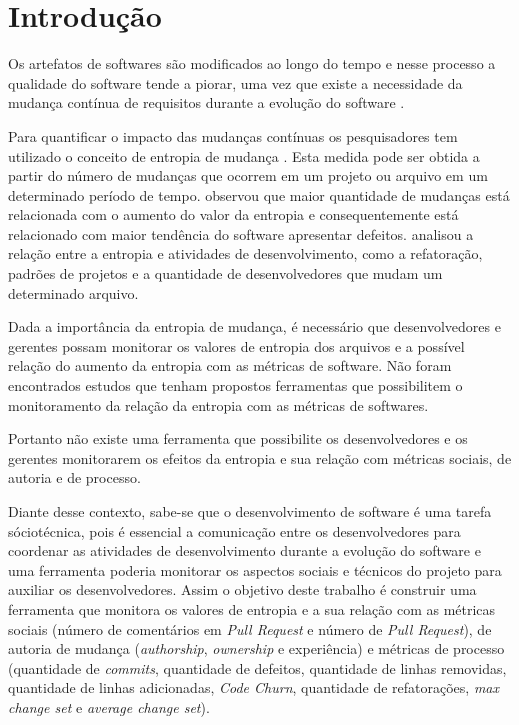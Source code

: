 \chapter{Introdução}

Os artefatos de softwares são modificados ao longo do tempo e nesse processo a qualidade do software tende a piorar, uma vez que existe a necessidade da mudança contínua de requisitos durante a evolução do software \cite{Hassan:2009:PFU:1555001.1555024}.

Para quantificar o impacto das mudanças contínuas os pesquisadores tem utilizado o conceito de entropia de mudança \cite{Hassan:2009:PFU:1555001.1555024}. Esta medida pode ser obtida a partir do número de mudanças que ocorrem em um projeto ou arquivo em um determinado período de tempo.  observou que maior quantidade de mudanças está relacionada com o aumento do valor da entropia e consequentemente está relacionado com maior tendência do software apresentar defeitos.  analisou a relação entre a entropia e atividades de desenvolvimento, como a refatoração, padrões de projetos e a quantidade de desenvolvedores que mudam um determinado arquivo.

Dada a importância da entropia de mudança, é necessário que desenvolvedores e gerentes possam monitorar os valores de entropia dos arquivos e a possível relação do aumento da entropia com as métricas de software. Não foram encontrados estudos que tenham propostos ferramentas que possibilitem o monitoramento da relação da entropia com as métricas de softwares.

Portanto não existe uma ferramenta que possibilite os desenvolvedores e os gerentes monitorarem os efeitos da entropia e sua relação com métricas sociais, de autoria e de processo.

Diante desse contexto, sabe-se que o desenvolvimento de software é uma tarefa sóciotécnica, pois é essencial a comunicação entre os desenvolvedores para coordenar as atividades de desenvolvimento durante a evolução do software e uma ferramenta poderia monitorar os aspectos sociais e técnicos do projeto para auxiliar os desenvolvedores. Assim o objetivo deste trabalho é construir uma ferramenta que monitora os valores de entropia e a sua relação com as métricas sociais (número de comentários em \textit{Pull Request} e número de \textit{Pull Request}), de autoria de mudança (\textit{authorship}, \textit{ownership} e experiência) e métricas de processo (quantidade de \textit{commits}, quantidade de defeitos, quantidade de linhas removidas, quantidade de linhas adicionadas, \textit{Code Churn}, quantidade de refatorações, \textit{max change set} e \textit{average change set}).

